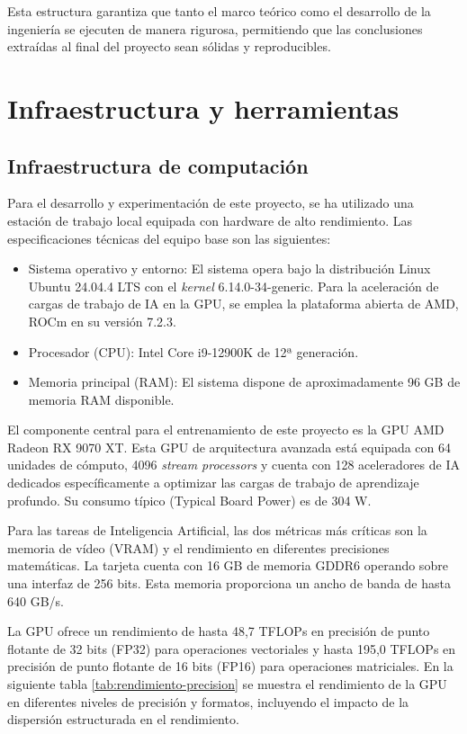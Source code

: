 \documentclass[11pt,a4paper,spanish]{book}
\numberwithin{equation}{chapter}
\numberwithin{figure}{chapter}
\begin{document}
Esta estructura garantiza que tanto el marco teórico como el desarrollo de la ingeniería se ejecuten de manera rigurosa, permitiendo que las conclusiones extraídas al final del proyecto sean sólidas y 
reproducibles.

\chapter{Infraestructura y herramientas}

\section{Infraestructura de computación}

Para el desarrollo y experimentación de este proyecto, se ha utilizado una estación de trabajo local equipada con hardware de alto rendimiento. Las especificaciones técnicas del equipo base son las siguientes:

\begin{itemize}
	\item Sistema operativo y entorno: El sistema opera bajo la distribución Linux Ubuntu 24.04.4 LTS con el \textit{kernel} 6.14.0-34-generic. 
	Para la aceleración de cargas de trabajo de IA en la GPU, se emplea la plataforma abierta de AMD, ROCm en su versión 7.2.3.
	\item Procesador (CPU): Intel Core i9-12900K de 12ª generación.
	\item Memoria principal (RAM): El sistema dispone de aproximadamente 96 GB de memoria RAM disponible.
\end{itemize}

El componente central para el entrenamiento de este proyecto es la GPU AMD Radeon RX 9070 XT. Esta GPU de arquitectura avanzada está equipada con 64 unidades de cómputo, 4096 \textit{stream processors} y 
cuenta con 128 aceleradores de IA dedicados específicamente a optimizar las cargas de trabajo de aprendizaje profundo. Su consumo típico (Typical Board Power) es de 304 W.

Para las tareas de Inteligencia Artificial, las dos métricas más críticas son la memoria de vídeo (VRAM) y el rendimiento en diferentes precisiones matemáticas. La tarjeta cuenta con 16 GB de 
memoria GDDR6 operando sobre una interfaz de 256 bits. Esta memoria proporciona un ancho de banda de hasta 640 GB/s.

La GPU ofrece un rendimiento de hasta 48,7 TFLOPs en precisión de punto flotante de 32 bits (FP32) para operaciones vectoriales y hasta 195,0 TFLOPs en precisión de punto flotante de 16 bits (FP16) 
para operaciones matriciales. En la siguiente tabla \ref{tab:rendimiento-precision} se muestra el rendimiento de la GPU en diferentes niveles de precisión y formatos, 
incluyendo el impacto de la dispersión estructurada en el rendimiento.
\end{document}
